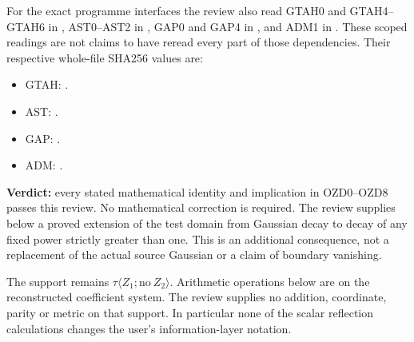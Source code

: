 For the exact programme interfaces the review also read GTAH0 and
GTAH4--GTAH6 in
\href{https://github.com/KokunoYumeto/zeta-function-research-reader/blob/36a82ecca98addb8a98b48204e349737856c7223/workbenches/splitzero-tandem/continuations/20260924-cohomology-weight-and-character-lifts/geometric-positive-quotient/GEOMETRIC_TRANSFER_POSITIVE_ADJOINT_DEFECT.md}{},
AST0--AST2 in
\href{https://github.com/KokunoYumeto/zeta-function-research-reader/blob/main/workbenches/splitzero-tandem/continuations/20260925-full-source-tensor-and-original-divisor/gct/ADJOINT_DEFECT_SOURCE_TOPOLOGY_COMPARISON.md}{},
GAP0 and GAP4 in
\href{https://github.com/KokunoYumeto/zeta-function-research-reader/blob/main/workbenches/splitzero-tandem/continuations/20260925-full-source-tensor-and-original-divisor/identity/GAUSSIAN_FULL_SOURCE_APPROXIMATION.md}{},
and ADM1 in
\href{https://github.com/KokunoYumeto/zeta-function-research-reader/blob/main/workbenches/splitzero-tandem/continuations/20260925-full-source-tensor-and-original-divisor/identity/ACTUAL_DEFECT_MULTIPLIER_DOMAIN.md}{}.
These scoped readings are not claims to have reread every part of those
dependencies. Their respective whole-file SHA256 values are:

\begin{itemize}
\tightlist
\item
  GTAH:
  .
\item
  AST:
  .
\item
  GAP:
  .
\item
  ADM:
  .
\end{itemize}

\textbf{Verdict:} every stated mathematical identity and implication in
OZD0--OZD8 passes this review. No mathematical correction is required.
The review supplies below a proved extension of the test domain from
Gaussian decay to decay of any fixed power strictly greater than one.
This is an additional consequence, not a replacement of the actual
source Gaussian or a claim of boundary vanishing.

The support remains \(\tau\langle Z_1;\mathrm{no}\ Z_2\rangle\).
Arithmetic operations below are on the reconstructed coefficient system.
The review supplies no addition, coordinate, parity or metric on that
support. In particular none of the scalar reflection calculations
changes the user's information-layer notation.

